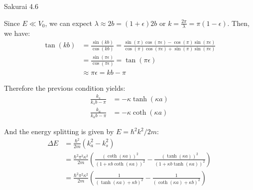 \documentclass{article}
\begin{document}
\begin{section}{Sakurai 4.6}
\begin{tcolorbox}[breakable]
	Since $E ≪ V_0$, we can expect $λ ≈ 2b = (1+ϵ) 2b$ or $k = \frac{2π}{λ} = π(1-ϵ)$. Then, we have:
	\begin{align*}
		\tan (kb) &= \frac{\sin(kb)}{\cos(kb)} = \frac{\sin(π)\cos(πϵ) - \cos(π)\sin(πϵ)}{\cos(π)\cos(πϵ) + \sin(π)\sin(πϵ)} \\
		&= \frac{\sin(πϵ)}{\cos(πϵ)} = \tan(πϵ) \\
		&≈ πϵ = kb - π 
	\end{align*}

	Therefore the previous condition yields:
	\begin{align*}
		\frac{k_s}{k_s b - π} &= -κ \tanh (κa) \\
		\frac{k_a}{k_a b - π} &= -κ \coth (κa) 
	\end{align*}

	And the energy splitting is given by $E = \hbar^2 k^2/2m$:
	\begin{align*}
		ΔE &= \frac{\hbar^2}{2m} (k_a^2 - k_s^2) \\
		&= \frac{\hbar^2π^2κ^2}{2m} \left( \frac{(\coth (κa))^2}{(1 + κb \coth (κa))^2} - \frac{(\tanh (κa))^2}{(1 + κb \tanh (κa))^2} \right) \\
		&= \frac{\hbar^2π^2κ^2}{2m} \left( \frac{1}{(\tanh(κa) + κb)^2} - \frac{1}{(\coth (κa) + κb)^2} \right) 
	\end{align*}
\end{tcolorbox}
\end{section}
\end{document}
